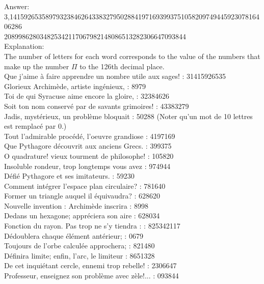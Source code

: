 \documentclass[letterpaper, 12pt]{article}
\begin{document}
Answer: \\
3,141592653589793238462643383279502884197169399375105820974944592307816406286\\
208998628034825342117067982148086513282306647093844\\

Explanation: \\

The number of letters for each word corresponds to the value of the numbers that make up the number $\Pi$ to the 126th decimal place.\\


Que j'aime \`a faire apprendre un nombre utile aux sages! : 31415926535\\
Glorieux Archim\`ede, artiste ing\'enieux, : 8979\\
Toi de qui Syracuse aime encore la gloire, : 32384626\\
Soit ton nom conserv\'e par de savants grimoires! : 43383279\\
Jadis, myst\'erieux, un probl\`eme bloquait : 50288  (Noter qu'un mot de 10
lettres est remplac\'e par 0.)\\
Tout l'admirable proc\'ed\'e, l'oeuvre grandiose : 4197169\\
Que Pythagore d\'ecouvrit aux anciens Grecs. : 399375\\
O quadrature! vieux tourment de philosophe! : 105820\\
Insoluble rondeur, trop longtemps vous avez : 974944\\
D\'efi\'e Pythagore et ses imitateurs. : 59230\\
Comment int\'egrer l'espace plan circulaire? : 781640\\
Former un triangle auquel il \'equivaudra? : 628620\\
Nouvelle invention : Archim\`ede inscrira : 8998\\
Dedans un hexagone; appr\'eciera son aire : 628034\\
Fonction du rayon. Pas trop ne s'y tiendra : : 825342117\\
D\'edoublera chaque \'el\'ement ant\'erieur; : 0679\\
Toujours de l'orbe calcul\'ee approchera; : 821480\\
D\'efinira limite; enfin, l'arc, le limiteur : 8651328\\
De cet inqui\'etant cercle, ennemi trop rebelle! : 2306647\\
Professeur, enseignez son probl\`eme avec z\`ele!... : 093844\\
\end{document}
